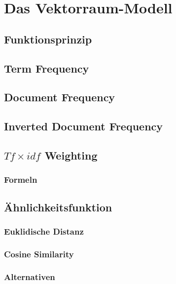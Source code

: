 \chapter{Das Vektorraum-Modell}


\section{Funktionsprinzip}
\section{Term Frequency}
\section{Document Frequency}
\section{Inverted Document Frequency}
\section{$Tf \times idf$ Weighting}
\subsection{Formeln}

\section{\"Ahnlichkeitsfunktion}
\subsection{Euklidische Distanz}
\subsection{Cosine Similarity}
\subsection{Alternativen}
